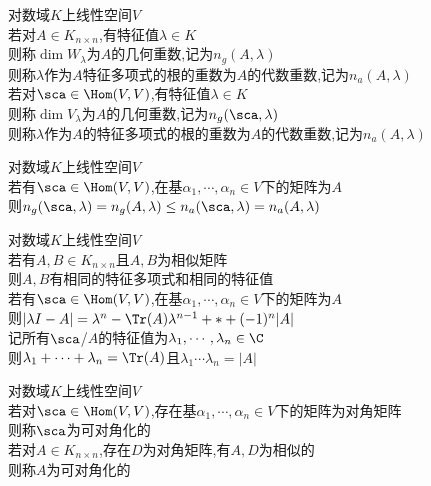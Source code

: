 \begin{dingyi}
对数域$K$上线性空间$V$\\
若对$A\in K_{n\times n}$,有特征值$\lambda\in K$\\
则称$\dim W_{\lambda}$为$A$的几何重数,记为$n_g(A,\lambda)$\\
则称$\lambda$作为$A$特征多项式的根的重数为$A$的代数重数,记为$n_a(A,\lambda)$\\
若对$\sca\in \Hom(V,V)$,有特征值$\lambda\in K$\\
则称$\dim V_{\lambda}$为$A$的几何重数,记为$n_g(\sca,\lambda)$\\
则称$\lambda$作为$A$的特征多项式的根的重数为$A$的代数重数,记为$n_a(A,\lambda)$
\end{dingyi}

\begin{dingli}
对数域$K$上线性空间$V$\\
若有$\sca\in \Hom(V,V)$,在基$\alpha_1,\cdots,\alpha_n\in V$下的矩阵为$A$\\
则$n_g(\sca,\lambda)=n_g(A,\lambda)\leq n_a(\sca,\lambda)=n_a(A,\lambda)$
\end{dingli}

\begin{dingli}
对数域$K$上线性空间$V$\\
若有$A,B\in K_{n\times n}$且$A,B$为相似矩阵\\
则$A,B$有相同的特征多项式和相同的特征值\\
若有$\sca\in \Hom(V,V)$,在基$\alpha_1,\cdots,\alpha_n\in V$下的矩阵为$A$\\
则$|\lambda I-A|=\lambda^n-\Tr(A)\lambda^{n-1}+*+(-1)^n|A|$\\
记所有$\sca$/$A$的特征值为$\lambda_1,\cdots,\lambda_n\in \C$\\
则$\lambda_1+\cdots+\lambda_n=\Tr(A)$且$\lambda_1\cdots\lambda_n=|A|$
\end{dingli}

\begin{dingyi}
对数域$K$上线性空间$V$\\
若对$\sca\in \Hom(V,V)$,存在基$\alpha_1,\cdots,\alpha_n\in V$下的矩阵为对角矩阵\\
则称$\sca$为可对角化的\\
若对$A\in K_{n\times n}$,存在$D$为对角矩阵,有$A,D$为相似的\\
则称$A$为可对角化的
\end{dingyi}

